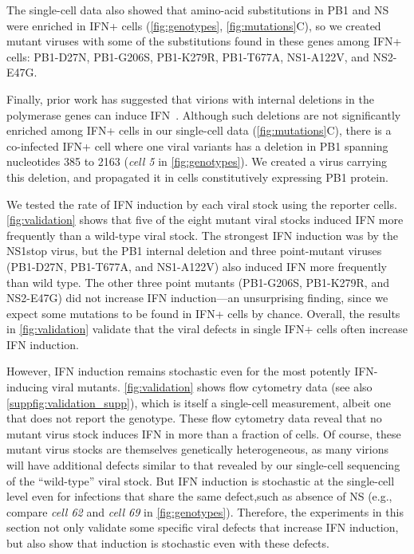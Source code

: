 \documentclass[10pt,letterpaper]{article}
\newcommand{\FIG}[1]{\autoref{fig:#1}}
\newcommand{\SUPPFIG}[1]{\autoref{suppfig:#1}}
\begin{document}
The single-cell data also showed that amino-acid substitutions in PB1 and NS were enriched in IFN+ cells (\FIG{genotypes}, \FIG{mutations}C), so we created mutant viruses with some of the substitutions found in these genes among IFN+ cells: PB1-D27N, PB1-G206S, PB1-K279R, PB1-T677A, NS1-A122V, and NS2-E47G.

Finally, prior work has suggested that virions with internal deletions in the polymerase genes can induce IFN~\citep{baum2010preference, tapia2013defective, boergeling2015evidence, dimmock2015cloned}.
Although such deletions are not significantly enriched among IFN+ cells in our single-cell data (\FIG{mutations}C), there is a co-infected IFN+ cell where one viral variants has a deletion in PB1 spanning nucleotides 385 to 2163 (\textit{cell 5} in \FIG{genotypes}).
We created a virus carrying this deletion, and propagated it in cells constitutively expressing PB1 protein.

We tested the rate of IFN induction by each viral stock using the reporter cells.
\FIG{validation} shows that five of the eight mutant viral stocks induced IFN more frequently than a wild-type viral stock.
The strongest IFN induction was by the NS1stop virus, but the PB1 internal deletion and three point-mutant viruses (PB1-D27N, PB1-T677A, and NS1-A122V) also induced IFN more frequently than wild type.
The other three point mutants (PB1-G206S, PB1-K279R, and NS2-E47G) did not increase IFN induction---an unsurprising finding, since we expect some mutations to be found in IFN+ cells by chance.
Overall, the results in \FIG{validation} validate that the viral defects in single IFN+ cells often increase IFN induction.

However, IFN induction remains stochastic even for the most potently IFN-inducing viral mutants.
\FIG{validation} shows flow cytometry data (see also \SUPPFIG{validation_supp}), which is itself a single-cell measurement, albeit one that does not report the genotype.
These flow cytometry data reveal that no mutant virus stock induces IFN in more than a fraction of cells.
Of course, these mutant virus stocks are themselves genetically heterogeneous, as many virions will have additional defects similar to that revealed by our single-cell sequencing of the ``wild-type'' viral stock.
But IFN induction is stochastic at the single-cell level even for infections that share the same defect,such as absence of NS (e.g., compare \textit{cell 62} and \textit{cell 69} in \FIG{genotypes}).
Therefore, the experiments in this section not only validate some specific viral defects that increase IFN induction, but also show that induction is stochastic even with these defects.
\end{document}
